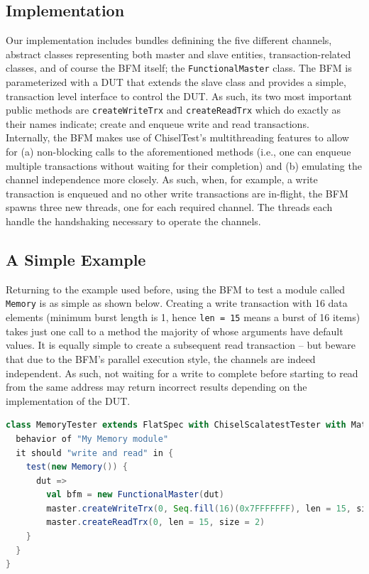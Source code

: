 \documentclass[runningheads]{llncs}
\begin{document}
\subsection{Implementation}
Our implementation includes bundles definining the five different channels, abstract classes representing both master and slave entities, transaction-related classes, and of course the BFM itself; the \texttt{FunctionalMaster} class. The BFM is parameterized with a DUT that extends the slave class and provides a simple, transaction level interface to control the DUT. As such, its two most important public methods are \texttt{createWriteTrx} and \texttt{createReadTrx} which do exactly as their names indicate; create and enqueue write and read transactions. \\

Internally, the BFM makes use of ChiselTest's multithreading features to allow for (a) non-blocking calls to the aforementioned methods (i.e., one can enqueue multiple transactions without waiting for their completion) and (b) emulating the channel independence more closely. As such, when, for example, a write transaction is enqueued and no other write transactions are in-flight, the BFM spawns three new threads, one for each required channel. The threads each handle the handshaking necessary to operate the channels.

\subsection{A Simple Example}
Returning to the example used before, using the BFM to test a module called \texttt{Memory} is as simple as shown below. Creating a write transaction with 16 data elements (minimum burst length is 1, hence \texttt{len = 15} means a burst of 16 items) takes just one call to a method the majority of whose arguments have default values. It is equally simple to create a subsequent read transaction -- but beware that due to the BFM's parallel execution style, the channels are indeed independent. As such, not waiting for a write to complete before starting to read from the same address may return incorrect results depending on the implementation of the DUT.
\begin{lstlisting}[language=scala, caption={Using the AXI4 BFM with ChiselTest}, label={lst:axitest}]
class MemoryTester extends FlatSpec with ChiselScalatestTester with Matchers {
  behavior of "My Memory module"
  it should "write and read" in {
    test(new Memory()) {
      dut =>
        val bfm = new FunctionalMaster(dut)
        master.createWriteTrx(0, Seq.fill(16)(0x7FFFFFFF), len = 15, size = 2)
        master.createReadTrx(0, len = 15, size = 2)
    }
  }
}
\end{lstlisting}
\end{document}

